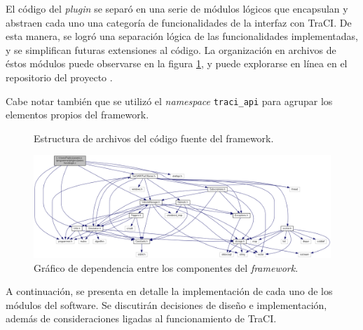 
El código del \emph{plugin} se separó en una serie de módulos lógicos que encapsulan y abstraen cada uno una categoría de funcionalidades de la interfaz con TraCI. De esta manera, se logró una separación lógica de las funcionalidades implementadas, y se simplifican futuras extensiones al código. La organización en archivos de éstos módulos puede observarse en la figura \ref{fig:dirtree}, y puede explorarse en línea en el repositorio del proyecto \autocite{pveins_github}.

Cabe notar también que se utilizó el \emph{namespace} \texttt{traci\_api} para agrupar los elementos propios del framework. 

\begin{figure}[tpbh]
    \caption{Estructura de archivos del código fuente del framework.}
    \label{fig:dirtree}
\end{figure}

\begin{figure}[tpbh]
    \centering
    \includegraphics[angle=90, origin=c, height=0.6\textheight]{figuras/plugin_dependency_graph.png}
    \caption{Gráfico de dependencia entre los componentes del \emph{framework}.}
    \label{fig:dependencygraph}
\end{figure}

A continuación, se presenta en detalle la implementación de cada uno de los módulos del software. Se discutirán decisiones de diseño e implementación, además de consideraciones ligadas al funcionamiento de TraCI.